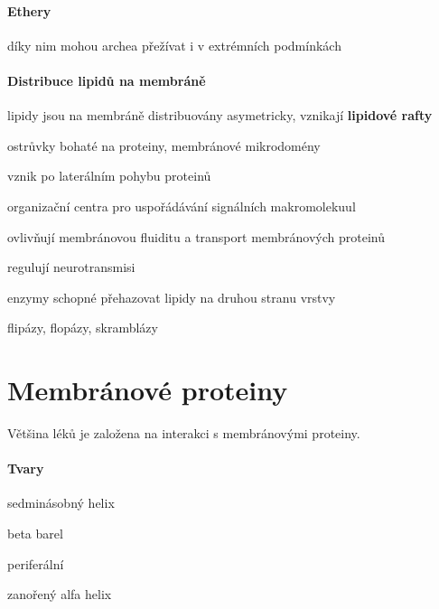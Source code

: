 \documentclass[DIV=8]{scrreprt}
\begin{document}
\paragraph{Ethery}
\begin{myItemize}[nosep]
    \item díky nim mohou archea přežívat i v extrémních podmínkách
\end{myItemize}



\paragraph{Distribuce lipidů na membráně}
\begin{myItemize}[nosep]
    \item lipidy jsou na membráně distribuovány asymetricky, vznikají \textbf{lipidové rafty}
\begin{myItemize}[nosep]
    \item ostrůvky bohaté na proteiny, membránové mikrodomény
    \item vznik po laterálním pohybu proteinů
    \item organizační centra pro uspořádávání signálních makromolekuul
    \item ovlivňují membránovou fluiditu a transport membránových proteinů
    \item regulují neurotransmisi
\end{myItemize}

    \item enzymy schopné přehazovat lipidy na druhou stranu vrstvy
\begin{myItemize}[nosep]
    \item flipázy, flopázy, skramblázy
\end{myItemize}

\end{myItemize}



\section{Membránové proteiny} \label{Membránové proteiny} \FloatBarrier


Většina léků je založena na interakci s membránovými proteiny.

\paragraph{Tvary}
\begin{myItemize}[nosep]
    \item sedminásobný helix
    \item beta barel
    \item periferální
    \item zanořený alfa helix
\end{myItemize}
\end{document}
